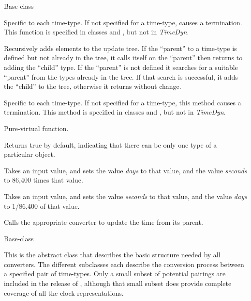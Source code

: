 {\begin{enumerate}

\label{ref:Time} Base-class

{\begin{enumerate}

\label{ref:addtypeinitialize}Specific to each time-type.  If not
specified for a time-type, causes a termination.  This function is
specified in classes  and
, but
not in \textit{TimeDyn}.

Recursively adds elements to the update tree. If the
``parent'' to a time-type is defined but not
already in the tree, it calls itself on the
``parent'' then returns to adding the
``child'' type. If the
``parent'' is not defined it searches for a
suitable ``parent'' from the types already in
the tree.  If that search is successful, it adds the
``child'' to the tree, otherwise it returns
without change.

Specific to each time-type.  If not specified for a time-type, this method
causes a
termination.  This method is specified in classes
 and ,
but not in \textit{TimeDyn}.

Pure-virtual function.

Returns true by default, indicating that there can be only one type of a
particular object.

Takes an input value, and sets the value \textit{days }to that value,
and the value \textit{seconds} to 86,400 times that value.

Takes an input value, and sets the value \textit{seconds} to that value,
and the value \textit{days} to 1/86,400 of that value.

Calls the appropriate converter to update the time from its parent.

\end{enumerate}}


 \label{ref:TimeConverter} Base-class

This is the abstract class that describes the basic structure needed by all
converters.  The different subclasses each describe the conversion process
between a
specified pair of time-types.  Only a small subset of potential
pairings are included in the release of \JEODid, although that small
subset does provide complete coverage of all the clock representations.




\end{enumerate}}
